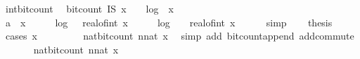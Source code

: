 \begin{isabellebody}
\endisatagproof
{\isafoldproof}%
%
\isadelimproof
\isanewline
%
\endisadelimproof
\isanewline
{}\isamarkupfalse%
\ int{\isacharunderscore}{\kern0pt}bit{\isacharunderscore}{\kern0pt}count{\isacharcolon}{\kern0pt}\isanewline
\ \ {\isachardoublequoteopen}bit{\isacharunderscore}{\kern0pt}count\ {\isacharparenleft}{\kern0pt}I\isactrlsub S\ x{\isacharparenright}{\kern0pt}\ {\isasymle}\ {}\ {\isacharasterisk}{\kern0pt}\ log\ {}\ {\isacharparenleft}{\kern0pt}{\isasymbar}x{\isasymbar}{\isacharplus}{\kern0pt}{}{\isacharparenright}{\kern0pt}\ {\isacharplus}{\kern0pt}\ {}{\isachardoublequoteclose}\isanewline
%
\isadelimproof
%
\endisadelimproof
%
\isatagproof
{}\isamarkupfalse%
\ {\isacharminus}{\kern0pt}\isanewline
\ \ \isamarkupfalse%
\ a{\isacharcolon}{\kern0pt}{\isachardoublequoteopen}{\isasymnot}{\isacharparenleft}{\kern0pt}{}\ {\isasymle}\ x{\isacharparenright}{\kern0pt}\ {\isasymLongrightarrow}\ {}\ {\isacharplus}{\kern0pt}\ {}\ {\isacharasterisk}{\kern0pt}\ log\ {}\ {\isacharparenleft}{\kern0pt}{\isacharminus}{\kern0pt}\ real{\isacharunderscore}{\kern0pt}of{\isacharunderscore}{\kern0pt}int\ x{\isacharparenright}{\kern0pt}\ {\isasymle}\ {}\ {\isacharplus}{\kern0pt}\ {}\ {\isacharasterisk}{\kern0pt}\ log\ {}\ {\isacharparenleft}{\kern0pt}{}\ {\isacharminus}{\kern0pt}\ real{\isacharunderscore}{\kern0pt}of{\isacharunderscore}{\kern0pt}int\ x{\isacharparenright}{\kern0pt}{\isachardoublequoteclose}\isanewline
\ \ \ \ \isamarkupfalse%
\ simp\isanewline
\ \ \isamarkupfalse%
\ {\isacharquery}{\kern0pt}thesis\isanewline
\ \ \ \ \isamarkupfalse%
\ {\isacharparenleft}{\kern0pt}cases\ {\isachardoublequoteopen}x\ {\isasymge}\ {}{\isachardoublequoteclose}{\isacharparenright}{\kern0pt}\isanewline
\ \ \ \ \ \isamarkupfalse%
\ nat{\isacharunderscore}{\kern0pt}bit{\isacharunderscore}{\kern0pt}count{\isacharbrackleft}{\kern0pt}\ n{\isacharequal}{\kern0pt}{\isachardoublequoteopen}nat\ x{\isachardoublequoteclose}{\isacharbrackright}{\kern0pt}\ \isamarkupfalse%
\ {\isacharparenleft}{\kern0pt}simp\ add{\isacharcolon}{\kern0pt}\ bit{\isacharunderscore}{\kern0pt}count{\isacharunderscore}{\kern0pt}append\ add{\isachardot}{\kern0pt}commute{\isacharparenright}{\kern0pt}\isanewline
\ \ \ \ \ \isamarkupfalse%
\ nat{\isacharunderscore}{\kern0pt}bit{\isacharunderscore}{\kern0pt}count{\isacharbrackleft}{\kern0pt}\ n{\isacharequal}{\kern0pt}{\isachardoublequoteopen}nat\ {\isacharparenleft}{\kern0pt}{\isacharminus}{\kern0pt}x{\isacharminus}{\kern0pt}{}{\isacharparenright}{\kern0pt}{\isachardoublequoteclose}{\isacharbrackright}{\kern0pt}\ \isamarkupfalse%

\end{isabellebody}
